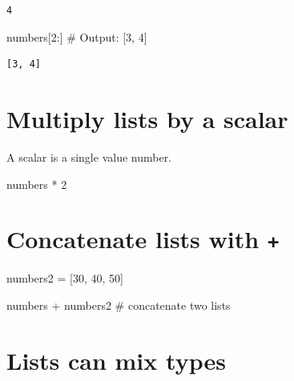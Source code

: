 \documentclass[
  letterpaper,
  DIV=11,
  numbers=noendperiod]{scrreprt}
\newenvironment{Shaded}{\begin{snugshade}}{\end{snugshade}}
\newcommand{\CommentTok}[1]{\textcolor[rgb]{0.37,0.37,0.37}{#1}}
\newcommand{\DecValTok}[1]{\textcolor[rgb]{0.68,0.00,0.00}{#1}}
\newcommand{\NormalTok}[1]{\textcolor[rgb]{0.00,0.23,0.31}{#1}}
\newcommand{\OperatorTok}[1]{\textcolor[rgb]{0.37,0.37,0.37}{#1}}
\begin{document}
\begin{verbatim}
4
\end{verbatim}

\begin{Shaded}
\begin{Highlighting}[]
\NormalTok{numbers[}\DecValTok{2}\NormalTok{:]  }\CommentTok{\# Output: [3, 4]}
\end{Highlighting}
\end{Shaded}

\begin{verbatim}
[3, 4]
\end{verbatim}

\hypertarget{multiply-lists-by-a-scalar}{%
\section{Multiply lists by a scalar}\label{multiply-lists-by-a-scalar}}

A scalar is a single value number.

\begin{Shaded}
\begin{Highlighting}[]
\NormalTok{numbers }\OperatorTok{*} \DecValTok{2}
\end{Highlighting}
\end{Shaded}

\hypertarget{concatenate-lists-with}{%
\section{\texorpdfstring{Concatenate lists with
\texttt{+}}{Concatenate lists with +}}\label{concatenate-lists-with}}

\begin{Shaded}
\begin{Highlighting}[]
\NormalTok{numbers2 }\OperatorTok{=}\NormalTok{ [}\DecValTok{30}\NormalTok{, }\DecValTok{40}\NormalTok{, }\DecValTok{50}\NormalTok{]}
\end{Highlighting}
\end{Shaded}

\begin{Shaded}
\begin{Highlighting}[]
\NormalTok{numbers }\OperatorTok{+}\NormalTok{ numbers2 }\CommentTok{\# concatenate two lists}
\end{Highlighting}
\end{Shaded}

\hypertarget{lists-can-mix-types}{%
\section{Lists can mix types}\label{lists-can-mix-types}}
\end{document}
